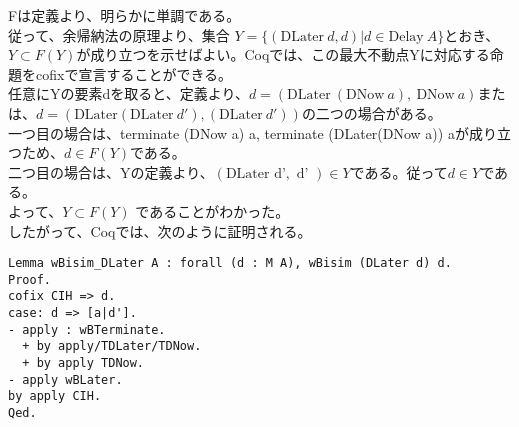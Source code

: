 \documentclass[japanese]{jssst_ppl}
\theoremstyle{definition}
\begin{document}
Fは定義より、明らかに単調である。\\
従って、余帰納法の原理より、集合 $Y = \{ (\text{DLater} \ d, d) | d \in \text{Delay} \ A \} $とおき、
$Y \subset F (Y) $が成り立つを示せばよい。Coqでは、この最大不動点Yに対応する命題をcofixで宣言することができる。\\
任意にYの要素dを取ると、定義より、$d = (\text{DLater} \ (\text{DNow} \ a), \ \text{DNow} \ a)$または、$d = (\text{DLater} (\text{DLater} \ d'), (\text{DLater} \ d'))$の二つの場合がある。\\
一つ目の場合は、terminate (DNow a) a, terminate (DLater(DNow a)) aが成り立つため、$d \in F(Y)$である。\\
二つ目の場合は、Yの定義より、$ ( \text{DLater d'}, \text{ d' } ) \in Y$である。従って$ d \in Y $である。\\
よって、$Y \subset F (Y)$ であることがわかった。\\
したがって、Coqでは、次のように証明される。
\begin{verbatim}
Lemma wBisim_DLater A : forall (d : M A), wBisim (DLater d) d.
Proof.
cofix CIH => d.
case: d => [a|d'].
- apply : wBTerminate.
  + by apply/TDLater/TDNow.
  + by apply TDNow.
- apply wBLater.
by apply CIH.
Qed.
\end{verbatim}



\end{document}
